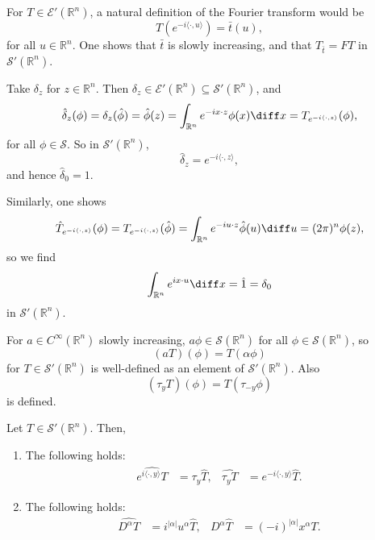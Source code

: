 \documentclass[12pt]{article}
\begin{document}
For $T \in \mathcal{E}'(\mathbb{R}^n)$, a natural definition of the Fourier transform would be
\[
T(e^{-i \langle \cdot, u \rangle}) = \bar t (u),
\]
for all $u \in \mathbb{R}^n$. One shows that $\bar t$ is slowly increasing, and that $T_{\bar t} = FT$ in $\mathcal{S}'(\mathbb{R}^n)$.

\begin{exbox}
	Take $\delta_z$ for $z \in \mathbb{R}^n$. Then $\delta_z \in \mathcal{E}'(\mathbb{R}^n) \subseteq \mathcal{S}'(\mathbb{R}^n)$, and
	\[
	\hat \delta_z(\phi) = \delta_z (\hat \phi) = \hat \phi(z) = \int_{\mathbb{R}^n} e^{-i x \cdot z} \phi(x) \diff x = T_{e^{-i\langle \cdot, z\rangle}}(\phi),
	\]
	for all $\phi \in \mathcal{S}$. So in $\mathcal{S}'(\mathbb{R}^n)$,
	\[
	\hat \delta_z = e^{-i \langle \cdot, z\rangle},
	\]
	and hence $\hat \delta_0 = 1$.

	Similarly, one shows
	\[
	\hat T_{e^{-i\langle \cdot, z\rangle}}(\phi) = T_{e^{-i\langle\cdot, z\rangle}}(\hat \phi) = \int_{\mathbb{R}^n} e^{-i u \cdot z} \hat \phi(u) \diff u = (2\pi)^n \phi(z),
	\]
	so we find
	\[
	\int_{\mathbb{R}^n} e^{i x \cdot u} \diff x = \hat 1 = \delta_0
	\]
	in $\mathcal{S}'(\mathbb{R}^n)$.
\end{exbox}

For $a \in C^\infty(\mathbb{R}^n)$ slowly increasing, $a \phi \in \mathcal{S}(\mathbb{R}^n)$ for all $\phi \in \mathcal{S}(\mathbb{R}^n)$, so
\[
	(a T)(\phi) = T(\alpha \phi)
\]
for $T \in \mathcal{S}'(\mathbb{R}^n)$ is well-defined as an element of $\mathcal{S}'(\mathbb{R}^n)$. Also 
\[
	(\tau_y T)(\phi) = T(\tau_{-y}\phi)
\]
is defined.

\begin{lemma}
	Let $T \in \mathcal{S}'(\mathbb{R}^n)$. Then,
	\begin{enumerate}[\normalfont(i)]
		\item The following holds:
			\begin{align*}
				\widehat{e^{i \langle \cdot, y\rangle} T} &= \tau_y \hat T, & \widehat{\tau_y T} &= e^{-i \langle \cdot, y\rangle} \hat T.
			\end{align*}
		\item The following holds:
			\begin{align*}
				\widehat{D^\alpha T} &= i^{|\alpha|}u^\alpha \hat T, & D^\alpha \hat T &= (-i)^{|\alpha|} \widehat{x^\alpha T}.
			\end{align*}
	\end{enumerate}
\end{lemma}
\end{document}
